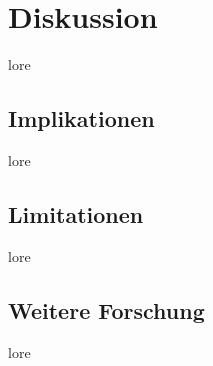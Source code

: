 \chapter{Diskussion}
lore
\section{Implikationen}
lore
\section{Limitationen}
lore
\section{Weitere Forschung}
lore